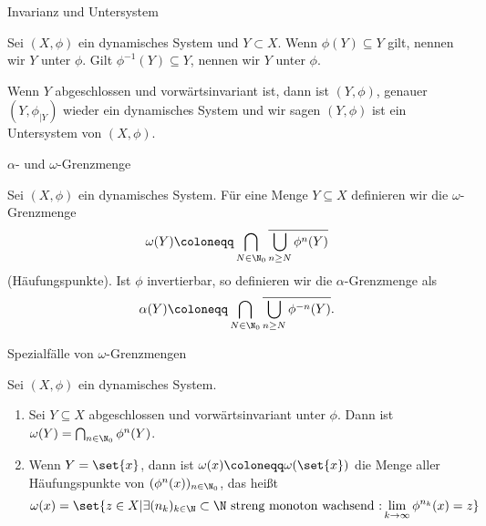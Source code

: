 \begin{definition}Invarianz und Untersystem

  Sei $(X, \phi)$ ein dynamisches System und $Y \subset X$. Wenn $\phi(Y) \subseteq Y$ gilt, nennen wir $Y$  unter $\phi$. Gilt $\phi^{-1}(Y) \subseteq Y$, nennen wir $Y$  unter $\phi$.

Wenn $Y$ abgeschlossen und vorwärtsinvariant ist, dann ist $(Y, \phi)$, genauer $\left( Y,\phi_{|Y}\right)$ wieder ein dynamisches System und wir sagen $(Y, \phi)$ ist ein Untersystem von $(X, \phi)$.
\end{definition}
\begin{definition} $\alpha$- und $\omega$-Grenzmenge

Sei $(X, \phi)$ ein dynamisches System. Für eine Menge $Y \subseteq X$ definieren wir die $\omega$-Grenzmenge 
\begin{align*}
  \omega(Y) \coloneqq \bigcap_{N \in \N_0} \overline{\bigcup_{n \geq N} \phi^n(Y)}
\end{align*}
(Häufungspunkte). Ist $\phi$ invertierbar, so definieren wir die $\alpha$-Grenzmenge als 
\begin{align*}
  \alpha(Y) \coloneqq \bigcap_{N \in \N_0} \overline{\bigcup_{n \geq N} \phi^{-n}(Y)}. 
\end{align*}
\end{definition}
\begin{lemma}\label{lem:spezial}Spezialfälle von $\omega$-Grenzmengen
  
Sei $(X, \phi)$ ein dynamisches System. 
\renewcommand{\labelenumi}{(\roman{enumi})}
\begin{enumerate} %
\item Sei $Y \subseteq X$ abgeschlossen und vorwärtsinvariant unter $\phi$. Dann ist $\omega(Y) = \bigcap_{n \in \N_0} \phi^n(Y)$.
\item Wenn $Y = \set{x}$, dann ist $\omega(x) \coloneqq \omega(\set{x})$ die Menge aller Häufungspunkte von $(\phi^n(x))_{n \in \N_0}$, das heißt
  \begin{align*}
    \omega(x) = \set{z \in X | \exists (n_k)_{k\in \N} \subset \N \text{ streng monoton wachsend :} \lim_{k \to \infty} \phi^{n_k}(x) = z}
  \end{align*}
\end{enumerate}
\end{lemma}
